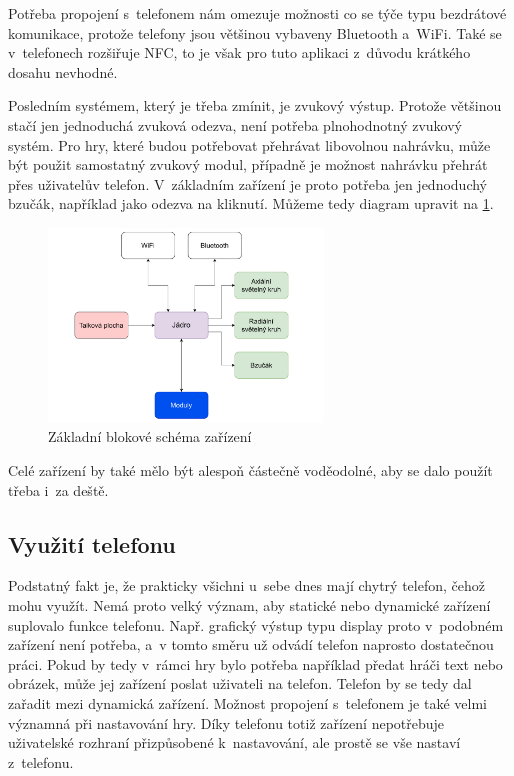 Potřeba propojení s~telefonem nám omezuje možnosti co se týče typu bezdrátové komunikace, protože telefony jsou většinou vybaveny Bluetooth a~WiFi.
Také se v~telefonech rozšiřuje NFC, to je však pro tuto aplikaci z~důvodu krátkého dosahu nevhodné.

Posledním systémem, který je třeba zmínit, je zvukový výstup.
Protože většinou stačí jen jednoduchá zvuková odezva, není potřeba plnohodnotný zvukový systém.
Pro hry, které budou potřebovat přehrávat libovolnou nahrávku, může být použit samostatný zvukový modul, případně je možnost nahrávku přehrát přes uživatelův telefon.
V~základním zařízení je proto potřeba jen jednoduchý bzučák, například jako odezva na kliknutí.
Můžeme tedy diagram upravit na \ref{fig:diagram_zanoreni_1}.
\begin{figure}[h]
    \centering
    \includegraphics[width=0.65\textwidth]{text/TeoretickyUvod/AplikaceHernichZarizeni/diagram/zanoreni_1.pdf}
    \caption{Základní blokové schéma zařízení}
    \label{fig:diagram_zanoreni_1}
\end{figure}

Celé zařízení by také mělo být alespoň částečně voděodolné, aby se dalo použít třeba i~za deště.

\subsection{Využití telefonu \label{VyuzitiTelefonu}}
Podstatný fakt je, že prakticky všichni u~sebe dnes mají chytrý telefon, čehož mohu využít.
Nemá proto velký význam, aby statické nebo dynamické zařízení suplovalo funkce telefonu.
Např. grafický výstup typu display proto v~podobném zařízení není potřeba, a~v tomto směru už odvádí telefon naprosto dostatečnou práci.
Pokud by tedy v~rámci hry bylo potřeba například předat hráči text nebo obrázek, může jej zařízení poslat uživateli na telefon.
Telefon by se tedy dal zařadit mezi dynamická zařízení.
Možnost propojení s~telefonem je také velmi významná při nastavování hry.
Díky telefonu totiž zařízení nepotřebuje uživatelské rozhraní přizpůsobené k~nastavování, ale prostě se vše nastaví z~telefonu.


